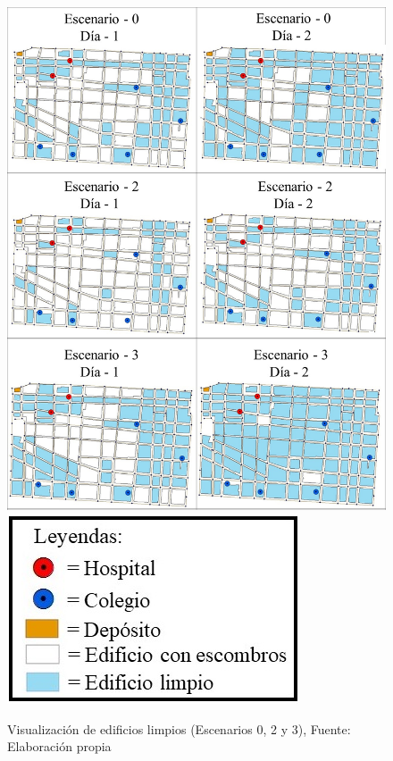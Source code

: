 \documentclass[12pt,a4paper]{article}
\begin{document}
\begin{figure}[h!]
\centering
\includegraphics[scale=0.3]{Figuras/visu3.jpg} 
\includegraphics[scale=0.4]{Figuras/simb2.jpg} 
\caption{Visualización de edificios limpios  (Escenarios 0, 2 y 3), Fuente: Elaboración propia}
\label{fig:esc023-visu}
\end{figure}
	
\end{document}
